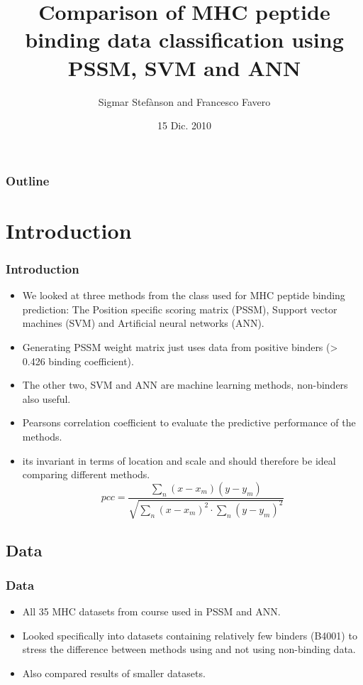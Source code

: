 \documentclass[presentation]{beamer}   %
\begin{document}

\author{Sigmar Stef\`{a}nson and Francesco Favero}
\title[PSSM,ANN,SVM]{Comparison of MHC peptide binding data classification using PSSM, SVM and ANN}
\date{15 Dic. 2010}



\begin{frame}
  \maketitle
\end{frame}

\begin{frame}
  \frametitle{Outline}
  \tableofcontents[currentsection]
\end{frame}
\section{Introduction}
\begin{frame}
  \frametitle{Introduction}
  \begin{itemize}
    \item<1> We looked at three methods from the class used for MHC peptide binding prediction:
          The Position specific scoring matrix (PSSM), Support vector machines (SVM) and Artificial neural networks (ANN).
    \item<2> Generating PSSM weight matrix just uses data from positive binders (> 0.426 binding coefficient).
    \item<2> The other two, SVM and ANN are machine learning methods, non-binders also useful.
    \item<3> Pearsons correlation coefficient to evaluate the predictive performance of the methods.
    \item<3> its invariant in terms of location and scale and should therefore be ideal comparing different methods.
	\begin{equation}
		pcc = \frac{ \sum_n{(x-x_m)(y-y_m) } }{ \sqrt{ \sum_n{(x-x_m)^2}\cdot\sum_{n}{(y-y_m)^2} } }
	\end{equation}
  \end{itemize}
\end{frame}

\subsection{Data}
\begin{frame}
 \frametitle{Data}
  \begin{itemize}
    \item All 35 MHC datasets from course used in PSSM and ANN. \pause
    \item  Looked specifically into datasets containing relatively few binders (B4001) to stress the difference between methods using and not using non-binding data. \pause
    \item Also compared results of smaller datasets. 
  \end{itemize}
\end{frame}
\end{document}
